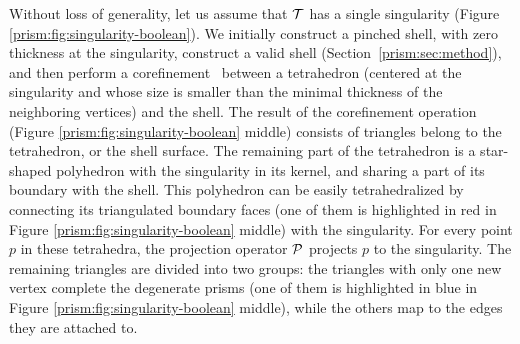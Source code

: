 Without loss of generality, let us assume that $\T$ has a single singularity (Figure \ref{prism:fig:singularity-boolean}). We initially construct a pinched shell, with zero thickness at the singularity, construct a valid shell (Section~\ref{prism:sec:method}), and then perform a corefinement~\cite{corefinement} between a tetrahedron (centered at the singularity and whose size is smaller than the minimal thickness of the neighboring vertices) and the shell. The result of the corefinement operation (Figure \ref{prism:fig:singularity-boolean} middle) consists of triangles belong to the tetrahedron, or the shell surface. The remaining part of the tetrahedron is a star-shaped polyhedron with the singularity in its kernel, and sharing a part of its boundary with the shell. This polyhedron can be easily tetrahedralized by connecting its triangulated boundary faces (one of them is highlighted in red in Figure \ref{prism:fig:singularity-boolean} middle) with the singularity. For every point $p$ in these tetrahedra, the projection operator $\P$ projects $p$ to the singularity. The remaining triangles are divided into two groups: 
the triangles with only one new vertex complete the degenerate prisms (one of them is highlighted in blue in Figure \ref{prism:fig:singularity-boolean} middle), 
while the others map to the edges they are attached to.





